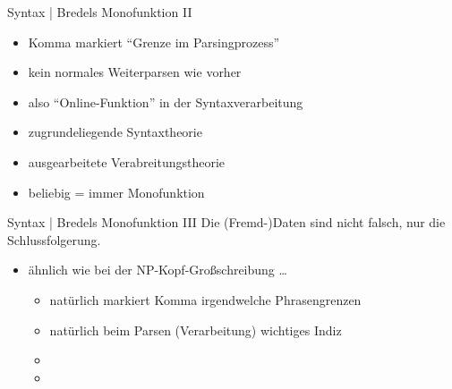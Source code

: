 \begin{frame}
  {Syntax | Bredels Monofunktion II}
  \onslide<+->
  \begin{itemize}[<+->]
	  \item Komma markiert \alert{"`Grenze im Parsingprozess"'}
          \item kein normales Weiterparsen wie vorher
	  \item also "`Online-Funktion"' in der Syntaxverarbeitung
		  \Halbzeile
	  \item {} zugrundeliegende Syntaxtheorie\\
	  \item {} ausgearbeitete Verabreitungstheorie
            \Halbzeile
	  \item beliebig  = immer Monofunktion\\
  \end{itemize}
\end{frame}

\begin{frame}
  {Syntax | Bredels Monofunktion III}
  \onslide<+->
  \onslide<+->
  Die (Fremd-)Daten sind nicht falsch, nur die Schlussfolgerung.\\
  \Zeile
  \begin{itemize}[<+->]
	  \item ähnlich wie bei der NP-Kopf-Großschreibung \ldots
            \Halbzeile
		  \begin{itemize}[<+->]
                          \item \alert{natürlich} markiert Komma irgendwelche Phrasengrenzen
			  \item \alert{natürlich} beim Parsen (Verarbeitung) wichtiges Indiz
				  \Halbzeile
			  \item {}
				  \Halbzeile
			  \item {}
		  \end{itemize}
  \end{itemize}
\end{frame}

